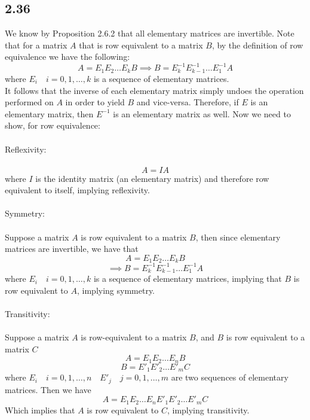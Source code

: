 \documentclass[letterpaper,12pt]{article}
\theoremstyle{definition}
\begin{document}
\subsection*{2.36}
We know by Proposition 2.6.2 that all elementary matrices are invertible. Note that for a matrix $A$ that is row equivalent to a matrix $B$, by the definition of row equivalence we have the following:
\[A  = E_1E_2\dots E_kB \implies  B = E_k^{-1}E_{k-1}^{-1}\dots E_1^{-1}A \]
where $E_i \quad i = 0,1,\dots,k$ is a sequence of elementary matrices.\\
It follows that the inverse of each elementary matrix simply undoes the operation performed on $A$ in order to yield $B$ and vice-versa. Therefore, if $E$ is an elementary matrix, then $E^{-1}$ is an elementary matrix as well.
Now we need to show, for row equivalence:
\\\\Reflexivity:\\\\
\[A = IA\]
where $I$ is the identity matrix (an elementary matrix) and therefore row equivalent to itself, implying reflexivity.
\\\\Symmetry:\\\\
Suppose a matrix $A$ is row equivalent to a matrix $B$, then since elementary matrices are invertible, we have that
\[A  = E_1E_2\dots E_kB \]
\[\implies B = E_k^{-1}E_{k-1}^{-1}\dots E_1^{-1}A \]
where $E_i \quad i = 0,1,\dots,k$ is a sequence of elementary matrices, implying that $B$ is row equivalent to $A$, implying symmetry.
\\\\Transitivity:\\\\
Suppose a matrix $A$ is row-equivalent to a matrix $B$, and $B$ is row equivalent to a matrix $C$
\[A  = E_1E_2\dots E_nB \]
\[B  = E'_1E'_2\dots E'_mC \]
where $E_i \quad i = 0,1,\dots,n \quad E'_j \quad j = 0,1,\dots,m$ are two sequences of elementary matrices.
Then we have 
\[A = E_1E_2\dots E_nE'_1E'_2\dots E'_mC\]
Which implies that $A$ is row equivalent to $C$, implying transitivity.
\end{document}
